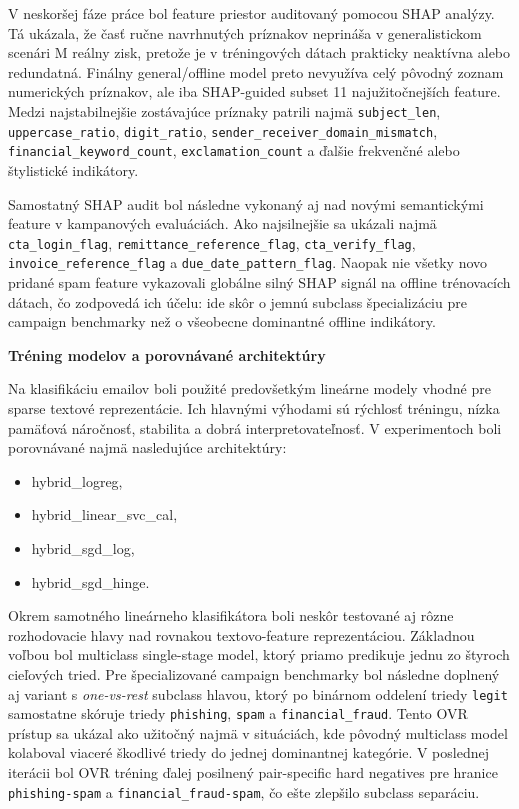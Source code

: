 \documentclass[conference]{IEEEtran}
\begin{document}
V neskoršej fáze práce bol feature priestor auditovaný pomocou SHAP analýzy. Tá ukázala, že časť ručne navrhnutých príznakov neprináša v generalistickom scenári M reálny zisk, pretože je v tréningových dátach prakticky neaktívna alebo redundatná. Finálny general/offline model preto nevyužíva celý pôvodný zoznam numerických príznakov, ale iba SHAP-guided subset 11 najužitočnejších feature. Medzi najstabilnejšie zostávajúce príznaky patrili najmä \texttt{subject\_len}, \texttt{uppercase\_ratio}, \texttt{digit\_ratio}, \texttt{sender\_receiver\_domain\_mismatch}, \texttt{financial\_keyword\_count}, \texttt{exclamation\_count} a ďalšie frekvenčné alebo štylistické indikátory.

Samostatný SHAP audit bol následne vykonaný aj nad novými semantickými feature v kampanových evaluáciách. Ako najsilnejšie sa ukázali najmä \texttt{cta\_login\_flag}, \texttt{remittance\_reference\_flag}, \texttt{cta\_verify\_flag}, \texttt{invoice\_reference\_flag} a \texttt{due\_date\_pattern\_flag}. Naopak nie všetky novo pridané spam feature vykazovali globálne silný SHAP signál na offline trénovacích dátach, čo zodpovedá ich účelu: ide skôr o jemnú subclass špecializáciu pre campaign benchmarky než o všeobecne dominantné offline indikátory.

\textbf{Tréning modelov a porovnávané architektúry}

Na klasifikáciu emailov boli použité predovšetkým lineárne modely vhodné pre sparse textové reprezentácie. Ich hlavnými výhodami sú rýchlosť tréningu, nízka pamäťová náročnosť, stabilita a dobrá interpretovateľnosť. V experimentoch boli porovnávané najmä nasledujúce architektúry:

\begin{itemize}
    \item hybrid\_logreg,
    \item hybrid\_linear\_svc\_cal,
    \item hybrid\_sgd\_log,
    \item hybrid\_sgd\_hinge.
\end{itemize}

Okrem samotného lineárneho klasifikátora boli neskôr testované aj rôzne rozhodovacie hlavy nad rovnakou textovo-feature reprezentáciou. Základnou voľbou bol multiclass single-stage model, ktorý priamo predikuje jednu zo štyroch cieľových tried. Pre špecializované campaign benchmarky bol následne doplnený aj variant s \textit{one-vs-rest} subclass hlavou, ktorý po binárnom oddelení triedy \texttt{legit} samostatne skóruje triedy \texttt{phishing}, \texttt{spam} a \texttt{financial\_fraud}. Tento OVR prístup sa ukázal ako užitočný najmä v situáciách, kde pôvodný multiclass model kolaboval viaceré škodlivé triedy do jednej dominantnej kategórie. V poslednej iterácii bol OVR tréning ďalej posilnený pair-specific hard negatives pre hranice \texttt{phishing-spam} a \texttt{financial\_fraud-spam}, čo ešte zlepšilo subclass separáciu.
\end{document}
